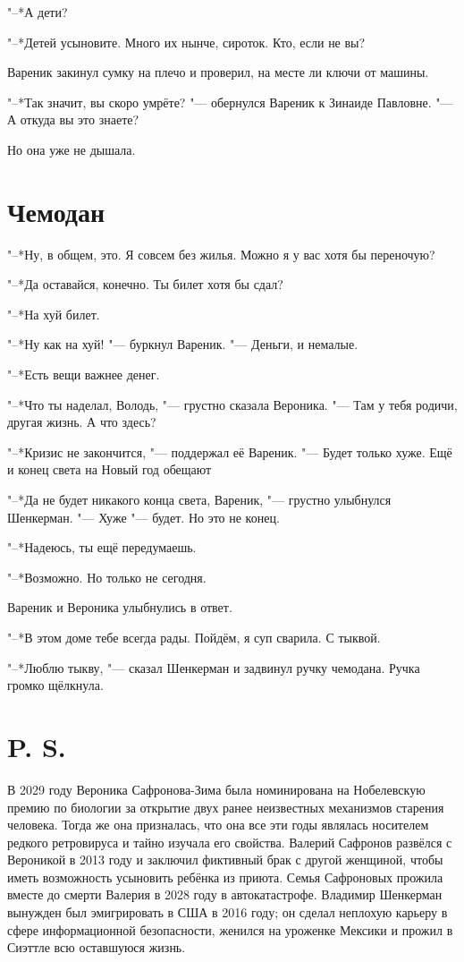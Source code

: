 "--*А дети?

"--*Детей усыновите.
Много их нынче, сироток.
Кто, если не вы?

Вареник закинул сумку на плечо и проверил, на месте ли ключи от машины.

"--*Так значит, вы скоро умрёте? "--- обернулся Вареник к Зинаиде Павловне. 
"--- А откуда вы это знаете?

Но она уже не дышала.

\section{Чемодан}

"--*Ну, в общем, это.
Я совсем без жилья.
Можно я у вас хотя бы переночую?

"--*Да оставайся, конечно.
Ты билет хотя бы сдал?

"--*На хуй билет.

"--*Ну как на хуй! "--- буркнул Вареник.
"--- Деньги, и немалые.

"--*Есть вещи важнее денег.

"--*Что ты наделал, Володь, "--- грустно сказала Вероника.
"--- Там у тебя родичи, другая жизнь.
А что здесь?

"--*Кризис не закончится, "--- поддержал её Вареник.
"--- Будет только хуже.
Ещё и конец света на Новый год обещают\ldotst

"--*Да не будет никакого конца света, Вареник, "--- грустно улыбнулся Шенкерман.
"--- Хуже "--- будет.
Но это не конец.

"--*Надеюсь, ты ещё передумаешь.

"--*Возможно.
Но только не сегодня.

Вареник и Вероника улыбнулись в ответ.

"--*В этом доме тебе всегда рады.
Пойдём, я суп сварила.
С тыквой.

"--*Люблю тыкву, "--- сказал Шенкерман и задвинул ручку чемодана.
Ручка громко щёлкнула.

\section{P. S.}

В 2029 году Вероника Сафронова-Зима была номинирована на Нобелевскую премию по биологии за открытие двух ранее неизвестных механизмов старения человека.
Тогда же она призналась, что она все эти годы являлась носителем редкого ретровируса и тайно изучала его свойства.
Валерий Сафронов развёлся с Вероникой в 2013 году и заключил фиктивный брак с другой женщиной, чтобы иметь возможность усыновить ребёнка из приюта.
Семья Сафроновых прожила вместе до смерти Валерия в 2028 году в автокатастрофе.
Владимир Шенкерман вынужден был эмигрировать в США в 2016 году;
он сделал неплохую карьеру в сфере информационной безопасности, женился на уроженке Мексики и прожил в Сиэттле всю оставшуюся жизнь.
